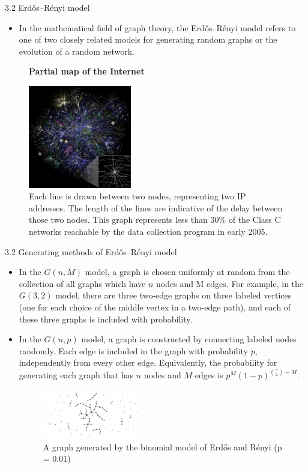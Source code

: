 \documentclass[
  notheorems,
  aspectratio=54,
]{beamer}
\begin{document}
\begin{frame}{3.2 Erdős–Rényi model}
  \begin{itemize}
      \item In the mathematical field of graph theory, the Erdős–Rényi model\cite{wiki:er_model} refers to one of two closely related models for generating random graphs or the evolution of a random network.
  \end{itemize}
  \begin{figure}
    \centering
    \textbf{Partial map of the Internet}\par\medskip
    \includegraphics[width=0.4\textwidth]{internet_map.jpg}
      \caption{Each line is drawn between two nodes, representing two IP addresses. The length of the lines are indicative of the delay between those two nodes. This graph represents less than 30\% of the Class C networks reachable by the data collection program in early 2005.}
  \end{figure}
\end{frame}

\begin{frame}{3.2 Generating methods of Erdős–Rényi model}
  \begin{itemize}
    \item In the $G(n, M)$ model, a graph is chosen uniformly at random from the collection of all graphs which have $n$ nodes and M edges. For example, in the $G(3,2)$ model, there are three two-edge graphs on three labeled vertices (one for each choice of the middle vertex in a two-edge path), and each of these three graphs is included with probability.
    \item In the $G(n, p)$ model, a graph is constructed by connecting labeled nodes randomly. Each edge is included in the graph with probability $p$, independently from every other edge. Equivalently, the probability for generating each graph that has $n$ nodes and $M$ edges is ${\displaystyle p^{M}(1-p)^{{n \choose 2}-M}}$.
  \begin{figure}
    \centering
    \includegraphics[width=0.4\textwidth]{er_example.jpg}
      \caption{A graph generated by the binomial model of Erdős and Rényi (p = 0.01)}
  \end{figure}
  \end{itemize}
\end{frame}
\end{document}
